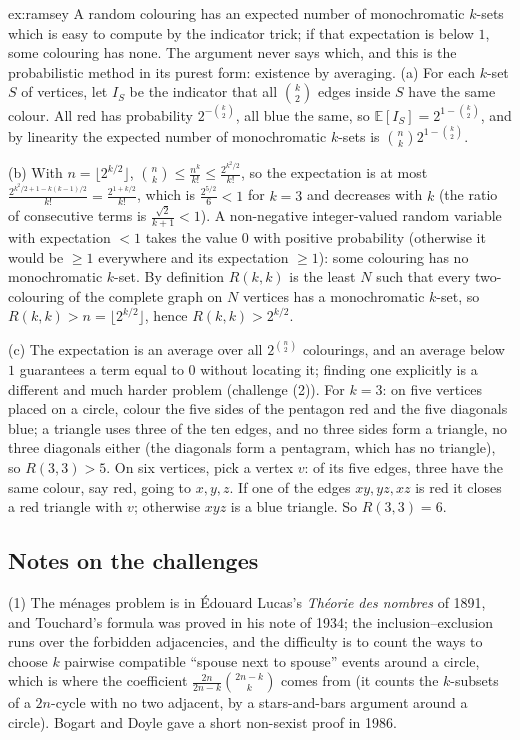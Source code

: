 \begin{solution}{ex:ramsey}
\idea A random colouring has an expected number of monochromatic $k$-sets which is easy to compute by the indicator trick; if that expectation is below $1$, some colouring has none. The argument never says which, and this is the probabilistic method in its purest form: existence by averaging.
\writeup (a) For each $k$-set $S$ of vertices, let $I_S$ be the indicator that all $\binom k2$ edges inside $S$ have the same colour. All red has probability $2^{-\binom k2}$, all blue the same, so $\mathbb E[I_S]=2^{1-\binom k2}$, and by linearity the expected number of monochromatic $k$-sets is $\binom nk2^{1-\binom k2}$.

(b) With $n=\lfloor2^{k/2}\rfloor$, $\binom nk\le\frac{n^k}{k!}\le\frac{2^{k^2/2}}{k!}$, so the expectation is at most $\frac{2^{k^2/2+1-k(k-1)/2}}{k!}=\frac{2^{1+k/2}}{k!}$, which is $\frac{2^{5/2}}6<1$ for $k=3$ and decreases with $k$ (the ratio of consecutive terms is $\frac{\sqrt2}{k+1}<1$). A non-negative integer-valued random variable with expectation $<1$ takes the value $0$ with positive probability (otherwise it would be $\ge1$ everywhere and its expectation $\ge1$): some colouring has no monochromatic $k$-set. By definition $R(k,k)$ is the least $N$ such that every two-colouring of the complete graph on $N$ vertices has a monochromatic $k$-set, so $R(k,k)>n=\lfloor2^{k/2}\rfloor$, hence $R(k,k)>2^{k/2}$.

(c) The expectation is an average over all $2^{\binom n2}$ colourings, and an average below $1$ guarantees a term equal to $0$ without locating it; finding one explicitly is a different and much harder problem (challenge (2)). For $k=3$: on five vertices placed on a circle, colour the five sides of the pentagon red and the five diagonals blue; a triangle uses three of the ten edges, and no three sides form a triangle, no three diagonals either (the diagonals form a pentagram, which has no triangle), so $R(3,3)>5$. On six vertices, pick a vertex $v$: of its five edges, three have the same colour, say red, going to $x,y,z$. If one of the edges $xy,yz,xz$ is red it closes a red triangle with $v$; otherwise $xyz$ is a blue triangle. So $R(3,3)=6$.
\end{solution}

\subsection*{Notes on the challenges}

(1) The m\'enages problem is in \'Edouard Lucas's \emph{Th\'eorie des nombres} of 1891, and Touchard's formula was proved in his note of 1934; the inclusion--exclusion runs over the forbidden adjacencies, and the difficulty is to count the ways to choose $k$ pairwise compatible ``spouse next to spouse'' events around a circle, which is where the coefficient $\frac{2n}{2n-k}\binom{2n-k}k$ comes from (it counts the $k$-subsets of a $2n$-cycle with no two adjacent, by a stars-and-bars argument around a circle). Bogart and Doyle gave a short non-sexist proof in 1986.

